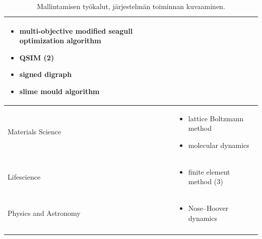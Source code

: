 \documentclass[utf8]{gradu3}
\begin{document}
\begin{longtable}[h]{|p{5cm}|p{8cm}|}
\begin{itemize}
        \item multi-objective modified seagull optimization algorithm
        \item QSIM (2)
        \item signed digraph
        \item slime mould algorithm
    \end{itemize} \\
    \hline
    Materials Science & \begin{itemize}
        \item lattice Boltzmann method
        \item molecular dynamics
    \end{itemize} \\
    \hline
    Lifescience & \begin{itemize}
        \item finite element method (3)
    \end{itemize} \\
    \hline
    Physics and Astronomy & \begin{itemize}
        \item Nose–Hoover dynamics
    \end{itemize} \\
    \hline
    \caption{Mallintamisen työkalut, järjestelmän toiminnan kuvaaminen.}
    \label{table:mallintaminen 1.}
\end{longtable}

\pagebreak
\end{document}
